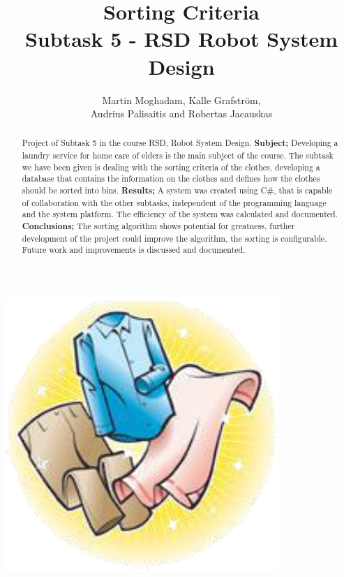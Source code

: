 \documentclass[a4paper, 11pt]{article}	%
\begin{document}
\begin{titlepage}
\title{\Huge \bfseries Sorting Criteria \vspace{3 mm}\\ \Large \normalfont Subtask 5 - RSD Robot System Design\vspace{10mm}}   %
\author{Martin Moghadam, Kalle Grafstr\"{o}m, \\ Audrius Palisaitis and Robertas Jacauskas}         %
\maketitle

\begin{center}
\includegraphics[scale=0.4]{frontPage}
\end{center}

\begin{abstract}
\noindent Project of Subtask 5 in the course RSD, Robot System Design. \textbf{Subject;} Developing a laundry service for home care of elders is the main subject of the course. The subtask we have been given is dealing with the sorting criteria of the clothes, developing a database that contains the information on the clothes and defines how the clothes should be sorted into bins. \textbf{Results;} A system was created using C\#, that is capable of collaboration with the other subtasks, independent of the programming language and the system platform. The efficiency of the system was calculated and documented. \textbf{Conclusions;} The sorting algorithm shows potential for greatness, further development of the project could improve the algorithm, the sorting is configurable. Future work and improvements is discussed and documented.
\end{abstract}

\end{titlepage}
\end{document}

